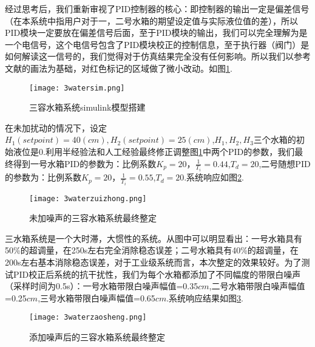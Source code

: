 \documentclass{WHUMaster}   %
\begin{document}
经过思考后，我们重新审视了PID控制器的核心：即控制器的输出一定是偏差信号（在本系统中指用户对于一，二号水箱的期望设定值与实际液位值的差），所以PID模块一定要放在偏差信号后面，至于PID模块的输出，我们可以完全理解为是一个电信号，这个电信号包含了PID模块校正的控制信息，至于执行器（阀门）是如何解读这一信号的，我们觉得对于仿真结果完全没有任何影响。所以我们以参考文献的画法为基础，对红色标记的区域做了微小改动。如图\ref{fig9}.
\newline 
\begin{figure}[h]
	\small
	\centering
	\texttt{[image: 3watersim.png]}
	\caption{三容水箱系统simulink模型搭建} \label{fig9}
\end{figure}

在未加扰动的情况下，设定$H_1(setpoint)=40(cm),H_2(setpoint)=25(cm)$,$H_1,H_2,H_3$三个水箱的初始液位是0.利用半经验法和人工经验最终修正调整图\ref{fig9}中两个PID的参数，我们最终得到一号水箱PID的参数为：比例系数$K_p=20$，$\frac{1}{T_i}=0.44$,$T_d=20$,二号随想PID的参数为：比例系数$K_p=20$，$\frac{1}{T_i}=0.55$,$T_d=20$.系统响应如图\ref{fig10}.

\begin{figure}[h]
	\small
	\centering
	\texttt{[image: 3waterzuizhong.png]}
	\caption{未加噪声的三容水箱系统最终整定} \label{fig10}
\end{figure}

三水箱系统是一个大时滞，大惯性的系统。从图中可以明显看出：一号水箱具有50\%的超调量，在250s左右完全消除稳态误差；二号水箱具有40\%的超调量，在200s左右基本消除稳态误差，对于工业级系统而言，本次整定的效果较好。为了测试PID校正后系统的抗干扰性，我们为每个水箱都添加了不同幅度的带限白噪声（采样时间为0.5s）：一号水箱带限白噪声幅值=0.35$cm$,二号水箱带限白噪声幅值=0.25$cm$,三号水箱带限白噪声幅值=0.65$cm$.系统响应结果如图\ref{fig11}.

\begin{figure}[h]
	\small
	\centering
	\texttt{[image: 3waterzaosheng.png]}
	\caption{添加噪声后的三容水箱系统最终整定} \label{fig11}
\end{figure}
\end{document}
